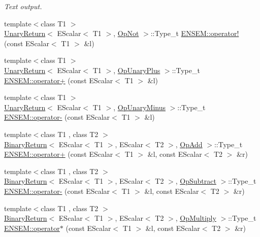 \begin{DoxyCompactItemize}
\begin{DoxyCompactList}\small\item\em Text output. \end{DoxyCompactList}\item 
{\footnotesize template$<$class T1 $>$ }\\\mbox{\hyperlink{structUnaryReturn}{Unary\+Return}}$<$ E\+Scalar$<$ T1 $>$, \mbox{\hyperlink{structOpNot}{Op\+Not}} $>$\+::Type\+\_\+t \mbox{\hyperlink{group__escalar_ga248e30ef2d97325ac4b11c077bc514dd}{E\+N\+S\+E\+M\+::operator!}} (const E\+Scalar$<$ T1 $>$ \&l)
\item 
{\footnotesize template$<$class T1 $>$ }\\\mbox{\hyperlink{structUnaryReturn}{Unary\+Return}}$<$ E\+Scalar$<$ T1 $>$, \mbox{\hyperlink{structOpUnaryPlus}{Op\+Unary\+Plus}} $>$\+::Type\+\_\+t \mbox{\hyperlink{group__escalar_ga45a6583b8f7490b2e54b5c88ff07ba94}{E\+N\+S\+E\+M\+::operator+}} (const E\+Scalar$<$ T1 $>$ \&l)
\item 
{\footnotesize template$<$class T1 $>$ }\\\mbox{\hyperlink{structUnaryReturn}{Unary\+Return}}$<$ E\+Scalar$<$ T1 $>$, \mbox{\hyperlink{structOpUnaryMinus}{Op\+Unary\+Minus}} $>$\+::Type\+\_\+t \mbox{\hyperlink{group__escalar_ga19df0fab753be25388f62c774ecdffae}{E\+N\+S\+E\+M\+::operator-\/}} (const E\+Scalar$<$ T1 $>$ \&l)
\item 
{\footnotesize template$<$class T1 , class T2 $>$ }\\\mbox{\hyperlink{structBinaryReturn}{Binary\+Return}}$<$ E\+Scalar$<$ T1 $>$, E\+Scalar$<$ T2 $>$, \mbox{\hyperlink{structOpAdd}{Op\+Add}} $>$\+::Type\+\_\+t \mbox{\hyperlink{group__escalar_gacf8bfdceca4578af5c8007fe00b2bf8e}{E\+N\+S\+E\+M\+::operator+}} (const E\+Scalar$<$ T1 $>$ \&l, const E\+Scalar$<$ T2 $>$ \&r)
\item 
{\footnotesize template$<$class T1 , class T2 $>$ }\\\mbox{\hyperlink{structBinaryReturn}{Binary\+Return}}$<$ E\+Scalar$<$ T1 $>$, E\+Scalar$<$ T2 $>$, \mbox{\hyperlink{structOpSubtract}{Op\+Subtract}} $>$\+::Type\+\_\+t \mbox{\hyperlink{group__escalar_gaab8719cf0db585f9ffd1685fff3e96d4}{E\+N\+S\+E\+M\+::operator-\/}} (const E\+Scalar$<$ T1 $>$ \&l, const E\+Scalar$<$ T2 $>$ \&r)
\item 
{\footnotesize template$<$class T1 , class T2 $>$ }\\\mbox{\hyperlink{structBinaryReturn}{Binary\+Return}}$<$ E\+Scalar$<$ T1 $>$, E\+Scalar$<$ T2 $>$, \mbox{\hyperlink{structOpMultiply}{Op\+Multiply}} $>$\+::Type\+\_\+t \mbox{\hyperlink{group__escalar_ga87a689c2f74aa616bca6523845562c12}{E\+N\+S\+E\+M\+::operator$\ast$}} (const E\+Scalar$<$ T1 $>$ \&l, const E\+Scalar$<$ T2 $>$ \&r)

\end{DoxyCompactItemize}
